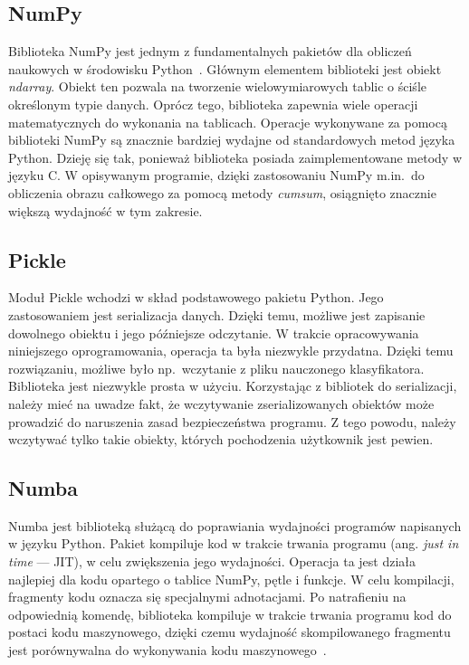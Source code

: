 \subsection{NumPy}
Biblioteka NumPy jest jednym z fundamentalnych pakietów dla obliczeń naukowych \linebreak w środowisku Python~\cite{numpy}.
Głównym elementem biblioteki jest obiekt \textit{ndarray}.
Obiekt ten pozwala na tworzenie wielowymiarowych tablic o ściśle określonym typie danych.
Oprócz tego, biblioteka zapewnia wiele operacji matematycznych do wykonania na tablicach.
Operacje wykonywane za pomocą biblioteki NumPy są znacznie bardziej wydajne od standardowych metod języka Python.
Dzieję się tak, ponieważ biblioteka posiada zaimplementowane metody w języku C\@.
W opisywanym programie, dzięki zastosowaniu NumPy m.in.\ do obliczenia obrazu całkowego za pomocą metody \textit{cumsum}, osiągnięto znacznie większą wydajność w tym zakresie.

\subsection{Pickle}
Moduł Pickle wchodzi w skład podstawowego pakietu Python.
Jego zastosowaniem jest serializacja danych.
Dzięki temu, możliwe jest zapisanie dowolnego obiektu i jego późniejsze odczytanie.
W trakcie opracowywania niniejszego oprogramowania, operacja ta była niezwykle przydatna.
Dzięki temu rozwiązaniu, możliwe było np.\ wczytanie \linebreak z pliku nauczonego klasyfikatora.
Biblioteka jest niezwykle prosta w użyciu.
Korzystając z bibliotek do serializacji, należy mieć na uwadze fakt, że wczytywanie zserializowanych obiektów może prowadzić do naruszenia zasad bezpieczeństwa programu.
Z tego powodu, należy wczytywać tylko takie obiekty, których pochodzenia użytkownik jest pewien.

\subsection{Numba}
Numba jest biblioteką służącą do poprawiania wydajności programów napisanych w języku Python.
Pakiet kompiluje kod w trakcie trwania programu (ang. \textit{just in time} --- JIT), w celu zwiększenia jego wydajności.
Operacja ta jest działa najlepiej dla kodu opartego o tablice NumPy, pętle i funkcje.
W celu kompilacji, fragmenty kodu oznacza się specjalnymi adnotacjami.
Po natrafieniu na odpowiednią komendę, biblioteka kompiluje \linebreak w trakcie trwania programu kod do postaci kodu maszynowego, dzięki czemu wydajność skompilowanego fragmentu jest porównywalna do wykonywania kodu maszynowego~\cite{numba}.

